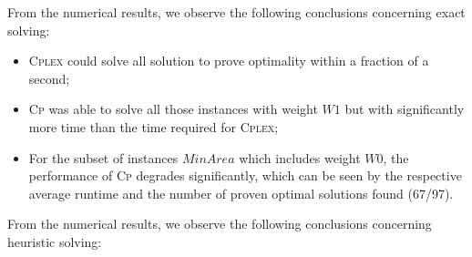 \documentclass[runningheads,a4paper]{elsarticle}
\begin{document}
        From the numerical results, we observe the following conclusions concerning exact solving:
        \begin{itemize}
        	\item  \textsc{Cplex} could solve all solution to prove optimality within a fraction of a second;
        	\item   \textsc{Cp} was able to solve all those instances with weight $W1$ but with significantly more time than the time required for \textsc{Cplex};
        	\item For the subset of instances $MinArea$ which includes weight $W0$, the performance of \textsc{Cp} degrades significantly, which can be seen  by the respective average runtime and the number of proven optimal solutions found (67/97).
        \end{itemize}
     From the numerical results, we observe the following conclusions concerning heuristic solving:
\end{document}

